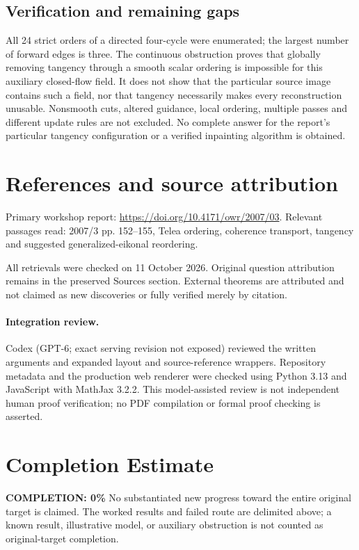 \documentclass[11pt]{article}
\begin{document}
\subsection{Verification and remaining gaps}
All 24 strict orders of a directed four-cycle were enumerated; the largest number of forward edges is three. The continuous obstruction proves that globally removing tangency through a smooth scalar ordering is impossible for this auxiliary closed-flow field. It does not show that the particular source image contains such a field, nor that tangency necessarily makes every reconstruction unusable. Nonsmooth cuts, altered guidance, local ordering, multiple passes and different update rules are not excluded. No complete answer for the report's particular tangency configuration or a verified inpainting algorithm is obtained.

\section{References and source attribution}
Primary workshop report: \url{https://doi.org/10.4171/owr/2007/03}. Relevant passages read: 2007/3 pp. 152--155, Telea ordering, coherence transport, tangency and suggested generalized-eikonal reordering.

All retrievals were checked on 11 October 2026. Original question attribution remains in the preserved Sources section. External theorems are attributed and not claimed as new discoveries or fully verified merely by citation.


\paragraph{Integration review.} Codex (GPT-6; exact serving revision not exposed) reviewed the written arguments and expanded layout and source-reference wrappers. Repository metadata and the production web renderer were checked using Python 3.13 and JavaScript with MathJax 3.2.2. This model-assisted review is not independent human proof verification; no PDF compilation or formal proof checking is asserted.

\section{Completion Estimate}
\noindent\textbf{COMPLETION: 0\%}
No substantiated new progress toward the entire original target is claimed. The worked results and failed route are delimited above; a known result, illustrative model, or auxiliary obstruction is not counted as original-target completion.
\end{document}
